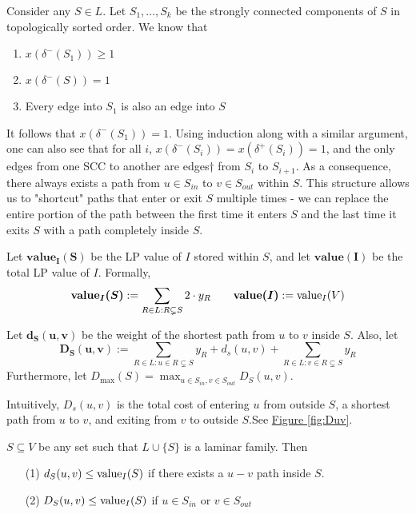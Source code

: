 
Consider any $S\in L$. Let $S_1,\ldots, S_k$ be the strongly connected components of $S$ in topologically sorted order. We know that
\begin{enumerate}
	\item $x(\delta^-(S_1)) \geq 1$
	\item $x(\delta^-(S)) = 1$
	\item Every edge into $S_1$ is also an edge into $S$
\end{enumerate}
It follows that $x(\delta^-(S_1)) = 1$. Using induction along with a similar argument, one can also see that for all $i$, $x(\delta^-(S_i)) = x(\delta^+(S_i)) = 1$, and the only edges from one SCC to another are edges† from $S_i$ to $S_{i + 1}$. As a consequence, there always exists a path from $u\in S_{in}$ to $v\in S_{out}$ within $S$. This structure allows us to "shortcut" paths that enter or exit $S$ multiple times - we can replace the entire portion of the path between the first time it enters $S$ and the last time it exits $S$ with a path completely inside $S$.\vspace{2mm}
\vspace{4mm}
\begin{definition} Let $\bm{\textbf{value}_I(S)}$ be the LP value of $I$ stored within $S$, and let $\bm{\textbf{value}(I)}$ be the total LP value of $I$. Formally, $$\bm{\textbf{value}_I(S)}:=\sum\limits_{R\in L:R\subsetneq S}2\cdot y_R\qquad \bm{\textbf{value}(I)}:=\textup{value}_I(V)$$
\end{definition}\vspace{2mm}
\begin{definition} Let $\bm{d_S(u,v)}$ be the weight of the shortest path from $u$ to $v$ inside $S$. Also, let \begin{equation}\bm{D_S(u,v)}:=\sum_{R\in L : u\in R\subsetneq S}y_R + d_s(u,v) + \sum_{R\in L : v\in R\subsetneq S}y_R\label{def-1}\end{equation}
	Furthermore, let $D_{\max}(S) = \max_{u \in S_{in}, v \in S_{out}}D_S(u,v)$.
\end{definition}

Intuitively, $D_s(u,v)$ is the total cost of entering $u$ from outside $S$, a shortest path from $u$ to $v$, and exiting from $v$ to outside $S$.See \hyperref[fig:Duv]{Figure \ref{fig:Duv}}.\vspace{2mm}
\begin{lemma}\label{lemm:2:D-val} $S\subseteq V$ be any set such that $L\cup \{S\}$ is a laminar family. Then\begin{enumerate}
	\item[(1)] $d_S(u,v)\leq \textup{value}_I(S)$ if there exists a $u-v$ path inside $S$.
	\item[(2)] $D_S(u,v)\leq \textup{value}_I(S)$ if $u\in S_{in}$ or $v\in S_{out}$
	\end{enumerate}
\end{lemma}
